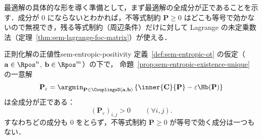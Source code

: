 最適解の具体的な形を導く準備として，まず最適解の全成分が正であることを示す．成分が $0$ にならないとわかれば，不等式制約 $\mathbf{P} \geq 0$ はどこも等号で効かないので無視でき，残る等式制約（周辺条件）だけに対して Lagrange の未定乗数法（定理~\ref{thm:sem-lagrange-foc-matrix}）が使える．

\begin{lemma}{正則化解の正値性}{sem-entropic-positivity}
  定義~\ref{def:sem-entropic-ot} の仮定（$\mathbf{a} \in \Rpos^n$, $\mathbf{b} \in \Rpos^m$）の下で，
  命題~\ref{prop:sem-entropic-existence-unique} の一意解
  \[
    \mathbf{P}_\varepsilon
    =
    \argmin_{\mathbf{P} \in \CouplingsD(\mathbf{a}, \mathbf{b})}
    \left\{
      \inner{\mathbf{C}}{\mathbf{P}}
      - \varepsilon \Hb(\mathbf{P})
    \right\}
  \]
  は全成分が正である：
  \[
    (\mathbf{P}_\varepsilon)_{i,j} > 0 \qquad (\forall i, j).
  \]
  すなわちどの成分も $0$ をとらず，不等式制約 $\mathbf{P} \geq 0$ が等号で効く成分は一つもない．
\end{lemma}

